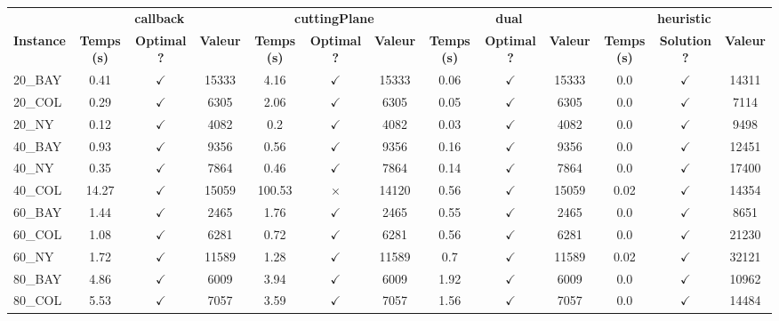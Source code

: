 \documentclass[main.tex]{subfiles}
\begin{document}
\begin{landscape}
\begin{center}
\renewcommand{\arraystretch}{1.4} 
 \begin{tabular}{lcccccccccccc}
	\hline
 & \multicolumn{3}{c}{\textbf{callback}} & \multicolumn{3}{c}{\textbf{cuttingPlane}} & \multicolumn{3}{c}{\textbf{dual}} & \multicolumn{3}{c}{\textbf{heuristic}}\\
\textbf{Instance}  & \textbf{Temps (s)} & \textbf{Optimal ?} & \textbf{Valeur} & \textbf{Temps (s)} & \textbf{Optimal ?} & \textbf{Valeur} & \textbf{Temps (s)} & \textbf{Optimal ?} & \textbf{Valeur} & \textbf{Temps (s)} & \textbf{Solution ?} & \textbf{Valeur}\\\hline

20\_BAY & 0.41 & $\checkmark$ & 15333 & 4.16 & $\checkmark$ & 15333 & 0.06 & $\checkmark$ & 15333 & 0.0 & $\checkmark$ & 14311\\
20\_COL & 0.29 & $\checkmark$ & 6305 & 2.06 & $\checkmark$ & 6305 & 0.05 & $\checkmark$ & 6305 & 0.0 & $\checkmark$ & 7114\\
20\_NY & 0.12 & $\checkmark$ & 4082 & 0.2 & $\checkmark$ & 4082 & 0.03 & $\checkmark$ & 4082 & 0.0 & $\checkmark$ & 9498\\
40\_BAY & 0.93 & $\checkmark$ & 9356 & 0.56 & $\checkmark$ & 9356 & 0.16 & $\checkmark$ & 9356 & 0.0 & $\checkmark$ & 12451\\
40\_NY & 0.35 & $\checkmark$ & 7864 & 0.46 & $\checkmark$ & 7864 & 0.14 & $\checkmark$ & 7864 & 0.0 & $\checkmark$ & 17400\\
40\_COL & 14.27 & $\checkmark$ & 15059 & 100.53 & $\times$ & 14120 & 0.56 & $\checkmark$ & 15059 & 0.02 & $\checkmark$ & 14354\\
60\_BAY & 1.44 & $\checkmark$ & 2465 & 1.76 & $\checkmark$ & 2465 & 0.55 & $\checkmark$ & 2465 & 0.0 & $\checkmark$ & 8651\\
60\_COL & 1.08 & $\checkmark$ & 6281 & 0.72 & $\checkmark$ & 6281 & 0.56 & $\checkmark$ & 6281 & 0.0 & $\checkmark$ & 21230\\
60\_NY & 1.72 & $\checkmark$ & 11589 & 1.28 & $\checkmark$ & 11589 & 0.7 & $\checkmark$ & 11589 & 0.02 & $\checkmark$ & 32121\\
80\_BAY & 4.86 & $\checkmark$ & 6009 & 3.94 & $\checkmark$ & 6009 & 1.92 & $\checkmark$ & 6009 & 0.0 & $\checkmark$ & 10962\\
80\_COL & 5.53 & $\checkmark$ & 7057 & 3.59 & $\checkmark$ & 7057 & 1.56 & $\checkmark$ & 7057 & 0.0 & $\checkmark$ & 14484\\

\end{tabular}
\end{center}
\end{landscape}
\end{document}
